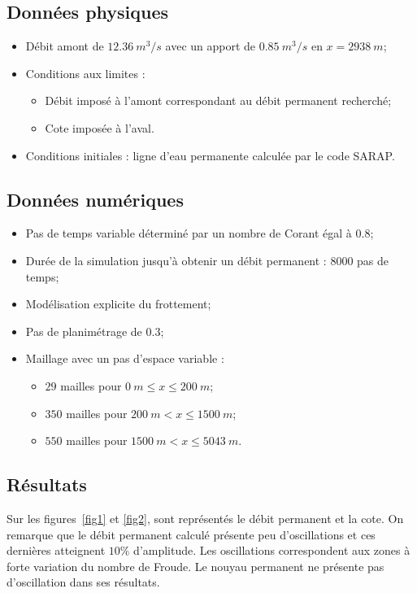 \documentclass[a4paper,10pt]{article}
\begin{document}
\subsection*{Données physiques}

\begin{itemize}
 \item Débit amont de $12.36\ m^3/s$ avec un apport de $0.85\ m^3/s$ en $x = 2938\ m$;
 \item Conditions aux limites :
 \begin{itemize}
  \item Débit imposé à l'amont correspondant au débit permanent recherché;
  \item Cote imposée à l'aval. 
 \end{itemize}
 \item Conditions initiales : ligne d'eau permanente calculée par le code SARAP.
\end{itemize}

\subsection*{Données numériques}

\begin{itemize}
 \item Pas de temps variable déterminé par un nombre de Corant égal à 0.8;
 \item Durée de la simulation jusqu'à obtenir un débit permanent : $8000$ pas de temps;
 \item Modélisation explicite du frottement;
 \item Pas de planimétrage de $0.3$;
 \item Maillage avec un pas d'espace variable :
 \begin{itemize}
  \item $29$ mailles pour $0\ m \leq x \leq 200\ m$;
  \item $350$ mailles pour $200\ m < x \leq 1500\ m$;
  \item $550$ mailles pour $1500\ m < x \leq 5043\ m$.
 \end{itemize}

\end{itemize}

\subsection*{Résultats}

Sur les figures~\ref{fig1} et \ref{fig2}, sont représentés le débit permanent et la cote. On remarque que le débit permanent calculé présente peu d'oscillations et ces dernières atteignent $10\%$ d'amplitude. Les oscillations correspondent aux zones à forte variation du nombre de Froude. Le nouyau permanent ne présente pas d'oscillation dans ses résultats.
\end{document}

